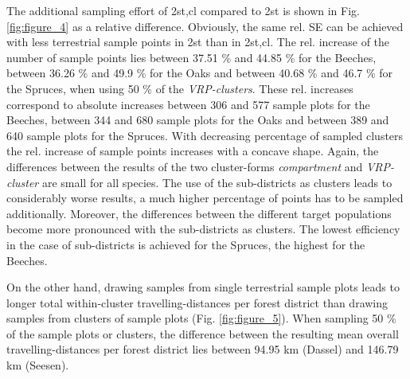 The additional sampling effort of 2st,cl compared to 2st is shown in Fig. \ref{fig:figure_4} as a relative difference. Obviously, the same rel. SE can be achieved with less terrestrial sample points in 2st than in 2st,cl. The rel. increase of the number of sample points lies between 37.51 \% and 44.85 \% for the Beeches, between 36.26 \% and 49.9 \% for the Oaks and between 40.68 \% and 46.7 \% for the Spruces, when using 50 \% of the \textit{VRP-clusters}. These rel. increases correspond to absolute increases between 306 and 577 sample plots for the Beeches, between 344 and 680 sample plots for the Oaks and between 389 and 640 sample plots for the Spruces. With decreasing percentage of sampled clusters the rel. increase of sample points increases with a concave shape. Again, the differences between the results of the two cluster-forms \textit{compartment} and \textit{VRP-cluster} are small for all species. The use of the sub-districts as clusters 
leads to considerably worse results, a much higher percentage of points has to be sampled additionally. Moreover, the differences between the different target populations become more pronounced with the sub-districts as clusters. The lowest efficiency in the case of sub-districts is achieved for the Spruces, the highest for the Beeches.

On the other hand, drawing samples from single terrestrial sample plots leads to longer total within-cluster travelling-distances per forest district than drawing samples from clusters of sample plots (Fig. \ref{fig:figure_5}). When sampling 50 \% of the sample plots or clusters, the difference between the resulting mean overall travelling-distances per forest district lies between 94.95 km (Dassel) and 146.79 km (Seesen).

